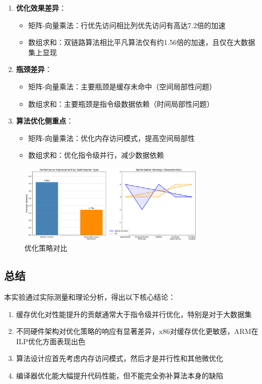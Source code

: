 \documentclass[a4paper,colorlinks=true,linkcolor=blue,urlcolor=blue,citecolor=green,bookmarks=true]{article}
\begin{document}
\begin{enumerate}
  \item \textbf{优化效果差异}：
  \begin{itemize}
    \item 矩阵-向量乘法：行优先访问相比列优先访问有高达7.2倍的加速
    \item 数组求和：双链路算法相比平凡算法仅有约1.56倍的加速，且仅在大数据集上显现
  \end{itemize}
  
  \item \textbf{瓶颈差异}：
  \begin{itemize}
    \item 矩阵-向量乘法：主要瓶颈是缓存未命中（空间局部性问题）
    \item 数组求和：主要瓶颈是指令级数据依赖（时间局部性问题）
  \end{itemize}
  
  \item \textbf{算法优化侧重点}：
  \begin{itemize}
    \item 矩阵-向量乘法：优化内存访问模式，提高空间局部性
    \item 数组求和：优化指令级并行，减少数据依赖
  \end{itemize}
\end{enumerate}

\begin{figure}[htbp]
  \centering
  \includegraphics[width=0.8\textwidth]{optimization_strategies_comparison.png}
  \caption{优化策略对比}
  \label{fig:optimization_strategies_comparison}
\end{figure}

\subsection{总结}

本实验通过实际测量和理论分析，得出以下核心结论：

\begin{enumerate}
  \item 缓存优化对性能提升的贡献通常大于指令级并行优化，特别是对于大数据集
  \item 不同硬件架构对优化策略的响应有显著差异，x86对缓存优化更敏感，ARM在ILP优化方面表现出色
  \item 算法设计应首先考虑内存访问模式，然后才是并行性和其他微优化
  \item 编译器优化能大幅提升代码性能，但不能完全弥补算法本身的缺陷
\end{enumerate}
\end{document}

